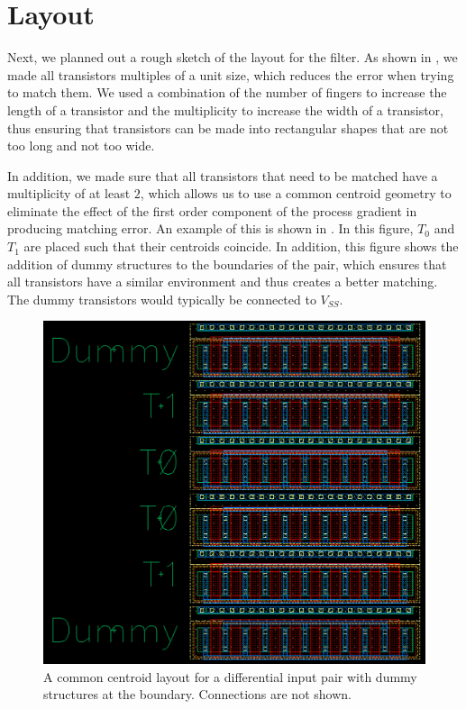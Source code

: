 \documentclass[journal,hidelinks]{IEEEtran}
\begin{document}
\section{Layout}

Next, we planned out a rough sketch of the layout for the filter. As shown in , we made all transistors multiples of a unit size, which reduces the error when trying to match them. We used a combination of the number of fingers to increase the length of a transistor and the multiplicity to increase the width of a transistor, thus ensuring that transistors can be made into rectangular shapes that are not too long and not too wide.

In addition, we made sure that all transistors that need to be matched have a multiplicity of at least $2$, which allows us to use a common centroid geometry to eliminate the effect of the first order component of the process gradient in producing matching error. An example of this is shown in . In this figure, $T_0$ and $T_1$ are placed such that their centroids coincide. In addition, this figure shows the addition of dummy structures to the boundaries of the pair, which ensures that all transistors have a similar environment and thus creates a better matching. The dummy transistors would typically be connected to $V_{SS}$.

\begin{figure}[!htb]
  \centering
  \includegraphics[width=\columnwidth]{layout/diff_pair.png}
  \caption{A common centroid layout for a differential input pair with dummy structures at the boundary. Connections are not shown.}
  \label{fig:layout_diff_pair}
\end{figure}
\end{document}

